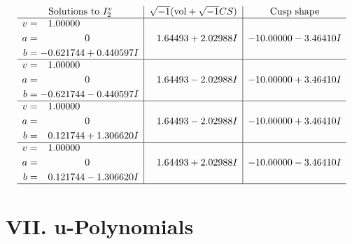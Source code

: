 \documentclass[1p]{elsarticle_modified}
\theoremstyle{definition}
\newcommand{\I}{\sqrt{-1}}
\begin{document}
$$\begin{array}{c|c|c}  
\text{Solutions to }I^v_{2}& \I (\text{vol} + \sqrt{-1}CS) & \text{Cusp shape}\\
 \hline 
\begin{aligned}
v &= \phantom{-}1.00000\phantom{ +0.000000I} \\
a &= \phantom{-0.000000 } 0 \\
b &= -0.621744 + 0.440597 I\end{aligned}
 & \phantom{-}1.64493 + 2.02988 I & -10.00000 - 3.46410 I \\ \hline\begin{aligned}
v &= \phantom{-}1.00000\phantom{ +0.000000I} \\
a &= \phantom{-0.000000 } 0 \\
b &= -0.621744 - 0.440597 I\end{aligned}
 & \phantom{-}1.64493 - 2.02988 I & -10.00000 + 3.46410 I \\ \hline\begin{aligned}
v &= \phantom{-}1.00000\phantom{ +0.000000I} \\
a &= \phantom{-0.000000 } 0 \\
b &= \phantom{-}0.121744 + 1.306620 I\end{aligned}
 & \phantom{-}1.64493 - 2.02988 I & -10.00000 + 3.46410 I \\ \hline\begin{aligned}
v &= \phantom{-}1.00000\phantom{ +0.000000I} \\
a &= \phantom{-0.000000 } 0 \\
b &= \phantom{-}0.121744 - 1.306620 I\end{aligned}
 & \phantom{-}1.64493 + 2.02988 I & -10.00000 - 3.46410 I\\
 \hline 
 \end{array}$$\newpage
\newpage\renewcommand{\arraystretch}{1}
\centering \section*{ VII. u-Polynomials}
\end{document}
